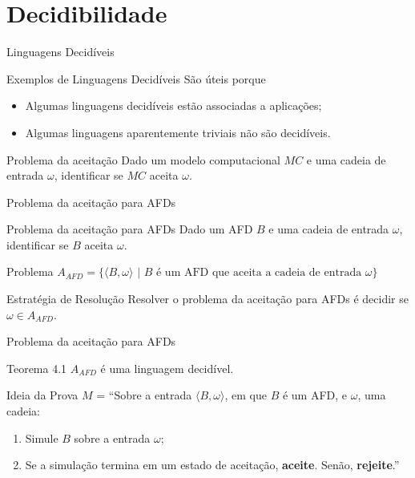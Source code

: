 \documentclass[xcolor=dvipsnames,table]{beamer}
\begin{document}
	\section{Decidibilidade}
	
	\begin{frame}{Linguagens Decidíveis}
		\begin{block}{Exemplos de Linguagens Decidíveis}
			São úteis porque
			\begin{itemize}
				\item Algumas linguagens decidíveis estão associadas a aplicações;
				\item Algumas linguagens aparentemente triviais não são decidíveis.
			\end{itemize}
		\end{block} \pause
		\begin{block}{Problema da aceitação}
			Dado um modelo computacional $MC$ e uma cadeia de entrada $\omega$, identificar se $MC$ aceita $\omega$.
		\end{block}	
	\end{frame}
	
	\begin{frame}{Problema da aceitação para AFDs}
		\begin{block}{Problema da aceitação para AFDs}
			Dado um AFD $B$ e uma cadeia de entrada $\omega$, identificar se $B$ aceita $\omega$.
		\end{block}	\pause
		\begin{block}{Problema}
			$A_{AFD} = \{ \langle B, \omega \rangle \mbox{ | } B \mbox{ é um AFD que aceita a cadeia de entrada } \omega \}$
		\end{block} \pause
		\begin{block}{Estratégia de Resolução}
			Resolver o problema da aceitação para AFDs é decidir se $\omega \in A_{AFD}$.
		\end{block}
	\end{frame}
	
	\begin{frame}{Problema da aceitação para AFDs}
		\begin{block}{Teorema 4.1}
			$A_{AFD}$ é uma linguagem decidível.
		\end{block} \pause
		\begin{block}{Ideia da Prova}
			$M$ = ``Sobre a entrada $\langle B, \omega \rangle$, em que $B$ é um AFD, e $\omega$, uma cadeia:
			\begin{enumerate}
				\item Simule $B$ sobre a entrada $\omega$;
				\item Se a simulação termina em um estado de aceitação, {\bf aceite}. Senão, {\bf rejeite}.''
			\end{enumerate}
		\end{block}
	\end{frame}
	
\end{document}
